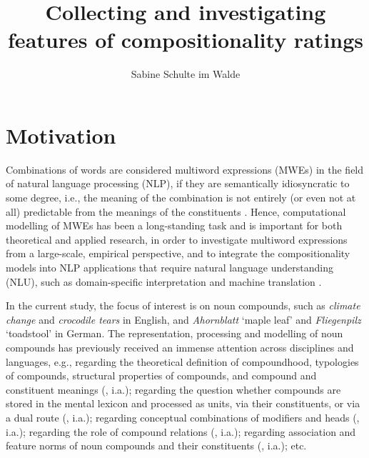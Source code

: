 \documentclass[output=paper,colorlinks,citecolor=brown]{langscibook}
\author{Sabine {Schulte im Walde}\orcid{0000-0002-8975-6255}\affiliation{Institute for Natural Language Processing, University of Stuttgart, Germany}}
\title{Collecting and investigating features of compositionality ratings}
\begin{document}
\maketitle

\section{Motivation}

Combinations of words are considered multiword expressions (MWEs) in the field of natural language processing (NLP), if they are semantically idiosyncratic to some degree, i.e., the meaning of the combination is not entirely (or even not at all) predictable from the meanings of the constituents \citep{Sag:Baldwin:2002, Baldwin/Kim:10, SavaryEtAl:18}. Hence, computational modelling of MWEs has been a long-standing task and is important for both theoretical and applied research, in order to investigate multiword expressions from a large-scale, empirical perspective, and to integrate the compositionality models into NLP applications that require natural language understanding (NLU), such as domain-specific interpretation \citep{Clouet/Daille:14, Haetty/SchulteImWalde:18b, HaettyEtAl:19b, BettingerEtAl:20, HaettyEtAl:21, EichelEtAl:23} and machine translation \citep{Carpuat/Diab:10, Cholakov_Kordoni:14, WellerEtAl:14b, CapEtAl:15, SalehiEtAl:15b, GamalloEtAl:19, DankersEtAl:22a}.

In the current study, the focus of interest is on noun compounds, such as \textit{climate change} and \textit{crocodile tears} in English, and \textit{Ahornblatt} `maple leaf' and \textit{Fliegenpilz} `toadstool' in German. The representation, processing and modelling of noun compounds has previously received an immense attention across disciplines and languages, e.g., regarding the theoretical definition of compoundhood, typologies of compounds, structural properties of compounds, and compound and constituent meanings (\citealt{Levi:78, Plag:03, Bauer:17, SchulteImWalde/Smolka:20}, i.a.); regarding the question whether compounds are stored in the mental lexicon and processed as units, via their constituents, or via a dual route (\citealt{Taft/Forster:75,Butterworth:83}, i.a.); regarding conceptual combinations of modifiers and heads (\citealt{Murphy:90,Wisniewski:96,Costello/Keane:00,Benczes:14}, i.a.); regarding the role of compound relations (\citealt{Gagne:02,Nastase:03, GirjuEtAl:05, SpaldingEtAl:10}, i.a.); regarding association and feature norms of noun compounds and their constituents (\citealt{Roller/SchulteImWalde:14, SchulteImWalde/Borgwaldt:15}, i.a.); etc.
\end{document}
